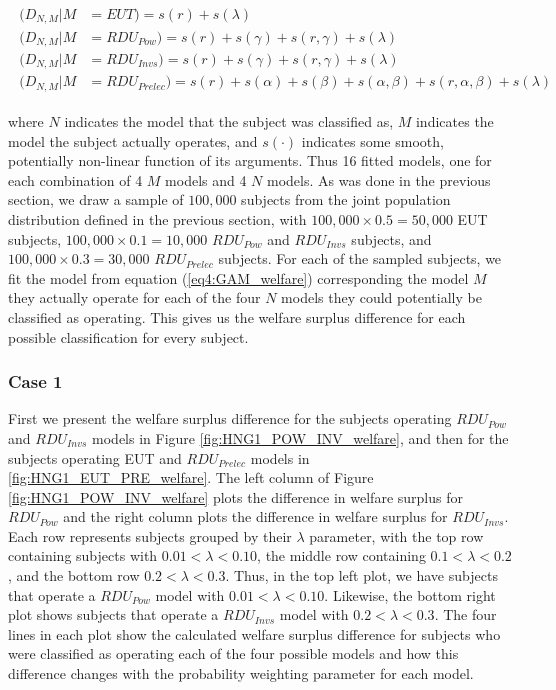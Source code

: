 \documentclass[../main.tex]{subfiles}
\begin{document}
\begin{align}
	\label{eq4:GAM_welfare}
	\begin{split}
		(D_{N,M} | M &= EUT)                   = s(r) + s(\lambda)\\
		(D_{N,M} | M &= \mathit{RDU_{Pow}})    = s(r) + s(\gamma) + s(r, \gamma) + s(\lambda)\\
		(D_{N,M} | M &= \mathit{RDU_{Invs}})   = s(r) + s(\gamma) + s(r, \gamma) + s(\lambda)\\
		(D_{N,M} | M &= \mathit{RDU_{Prelec}}) = s(r) + s(\alpha) + s(\beta) +s(\alpha, \beta) + s(r, \alpha, \beta) + s(\lambda)
	\end{split}
\end{align}

\noindent where $N$ indicates the model that the subject was classified as, $M$ indicates the model the subject actually operates, and $s(\cdot)$ indicates some smooth, potentially non-linear function of its arguments.
Thus 16 fitted models, one for each combination of 4 $M$ models and 4 $N$ models.
As was done in the previous section, we draw a sample of $100,000$ subjects from the joint population distribution defined in the previous section, with $100,000 \times 0.5 = 50,000$ EUT subjects, $100,000 \times 0.1 = 10,000$ $\mathit{RDU_{Pow}}$ and $\mathit{RDU_{Invs}}$ subjects, and $100,000 \times 0.3 = 30,000$ $\mathit{RDU_{Prelec}}$ subjects.
For each of the sampled subjects, we fit the model from equation (\ref{eq4:GAM_welfare}) corresponding the model $M$ they actually operate for each of the four $N$ models they could potentially be classified as operating.
This gives us the welfare surplus difference for each possible classification for every subject.

\subsubsection{Case 1}

First we present the welfare surplus difference for the subjects operating $\mathit{RDU_{Pow}}$ and $\mathit{RDU_{Invs}}$ models in Figure \ref{fig:HNG1_POW_INV_welfare}, and then for the subjects operating EUT and $\mathit{RDU_{Prelec}}$ models in \ref{fig:HNG1_EUT_PRE_welfare}.
The left column of Figure \ref{fig:HNG1_POW_INV_welfare} plots the difference in welfare surplus for $\mathit{RDU_{Pow}}$ and the right column plots the difference in welfare surplus for $\mathit{RDU_{Invs}}$.
Each row represents subjects grouped by their $\lambda$ parameter, with the top row containing subjects with $0.01 < \lambda < 0.10$, the middle row containing $0.1 < \lambda < 0.2$, and the bottom row $0.2 < \lambda < 0.3$.
Thus, in the top left plot, we have subjects that operate a $\mathit{RDU_{Pow}}$ model with $0.01 < \lambda < 0.10$.
Likewise, the bottom right plot shows subjects that operate a $\mathit{RDU_{Invs}}$ model with $0.2 < \lambda < 0.3$.
The four lines in each plot show the calculated welfare surplus difference for subjects who were classified as operating each of the four possible models and how this difference changes with the probability weighting parameter for each model.
\end{document}
